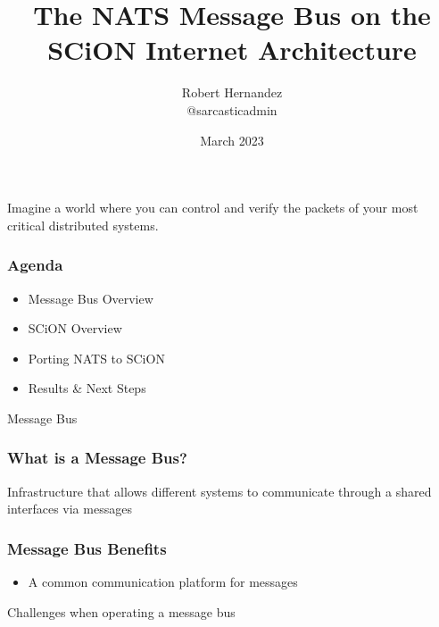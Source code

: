 \documentclass[aspectratio=169]{beamer}
\title[Default Options]{The NATS Message Bus on the SCiON Internet Architecture }
\author{
  Robert Hernandez \\
  @sarcasticadmin
}
\date{March 2023}
\begin{document}
\maketitle

\begin{frame}
  Imagine a world where you can control and verify the packets of your most critical distributed systems.
  \note[item]{}
\end{frame}

\begin{frame}
\frametitle{Agenda}
  \begin{itemize}[<alert@+>]
    \item Message Bus Overview
    \item SCiON Overview
    \item Porting NATS to SCiON
    \item Results \& Next Steps
  \end{itemize}
\end{frame}

\begin{frame}[c]
  \begin{center}
    \Huge{Message Bus}
  \end{center}
\end{frame}

\begin{frame}
\frametitle{What is a Message Bus?}
  Infrastructure that allows different systems to communicate through a shared interfaces via messages
\end{frame}

\begin{frame}
\frametitle{Message Bus Benefits}
  \begin{itemize}[<alert@+>]
    \item A common communication platform for messages
    \note[item]{}
  \end{itemize}
\end{frame}

\begin{frame}[c]
  \begin{center}
    \Huge{Challenges when operating a message bus}
  \end{center}
\end{frame}
\end{document}
